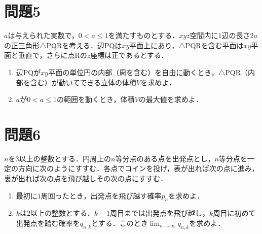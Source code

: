 \documentclass[unicode,12pt, A4j]{ltjsarticle}%
\begin{document}
\section{問題5}
$a$は与えられた実数で，$0<a\le 1$を満たすものとする．$xyz$空間内に$1$辺の長さ$2a$の正三角形$\triangle \mathrm{PQR}$を考える．辺$\mathrm{PQ}$は$xy$平面上にあり，$\triangle\mathrm{PQR}$を含む平面は$xy$平面と垂直で，さらに点$\mathrm{R}$の$z$座標は正であるとする．
\begin{enumerate}
 \item 辺$\mathrm{PQ}$が$xy$平面の単位円の内部（周を含む）を自由に動くとき，$\triangle\mathrm{PQR}$（内部を含む）が動いてできる立体の体積$V$を求めよ．
 \item $a$が$0<a\le 1$の範囲を動くとき，体積$V$の最大値を求めよ．
\end{enumerate}

\section{問題6}
$n$を$3$以上の整数とする．円周上の$n$等分点のある点を出発点とし，$n$等分点を一定の方向に次のようにすすむ．各点でコインを投げ，表が出れば次の点に進み，裏が出れば次の点を飛び越しその次の点にすすむ．

\begin{enumerate}
 \item 最初に$1$周回ったとき，出発点を飛び越す確率$p_n$を求めよ．
 \item $k$は$2$以上の整数とする．$k-1$周目までは出発点を飛び越し，$k$周目に初めて出発点を踏む確率を$q_{n,k}$とする．このとき$\lim_{n\to\infty}q_{n,k}$を求めよ．
\end{enumerate}
\end{document}
